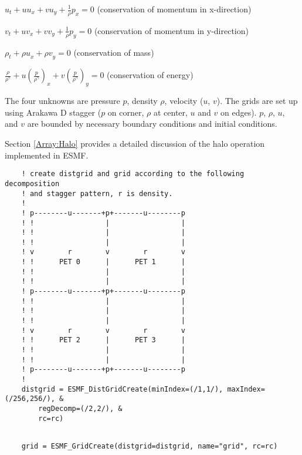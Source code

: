   
   $u_t + u u_x + v u_y + \frac{1}{\rho} p_x = 0$ (conservation of momentum in x-direction)
  
  
   $v_t + u v_x + v v_y + \frac{1}{\rho} p_y = 0$ (conservation of momentum in y-direction)
  
  
   ${\rho}_t + {\rho u}_x + {\rho v}_y = 0$ (conservation of mass)
  
  
   $\frac{\rho}{\rho^\gamma} + u {(\frac{p}{\rho^\gamma})}_x + v {(\frac{p}{\rho^\gamma})}_y = 0$ (conservation of energy)
  
  
   The four unknowns are pressure $p$, density $\rho$, velocity ($u$, $v$). The grids
   are set up using Arakawa D stagger ($p$ on corner, $\rho$ at center, $u$ and $v$ on edges).
   $p$, $\rho$, $u$, and $v$ are bounded by necessary boundary conditions and initial conditions.
  
  
   Section \ref{Array:Halo} provides a detailed discussion of the 
   halo operation implemented in ESMF. 

 \begin{verbatim}
    ! create distgrid and grid according to the following decomposition 
    ! and stagger pattern, r is density.
    !
    ! p--------u-------+p+-------u--------p
    ! !                 |                 |
    ! !                 |                 |
    ! !                 |                 |
    ! v        r        v        r        v
    ! !      PET 0      |      PET 1      |
    ! !                 |                 |
    ! !                 |                 |
    ! p--------u-------+p+-------u--------p
    ! !                 |                 |
    ! !                 |                 |
    ! !                 |                 |
    ! v        r        v        r        v
    ! !      PET 2      |      PET 3      |
    ! !                 |                 |
    ! !                 |                 |
    ! p--------u-------+p+-------u--------p
    !
    distgrid = ESMF_DistGridCreate(minIndex=(/1,1/), maxIndex=(/256,256/), &
        regDecomp=(/2,2/), &
        rc=rc)
 
\end{verbatim}
 

 \begin{verbatim}
    grid = ESMF_GridCreate(distgrid=distgrid, name="grid", rc=rc)
 
\end{verbatim}
 
